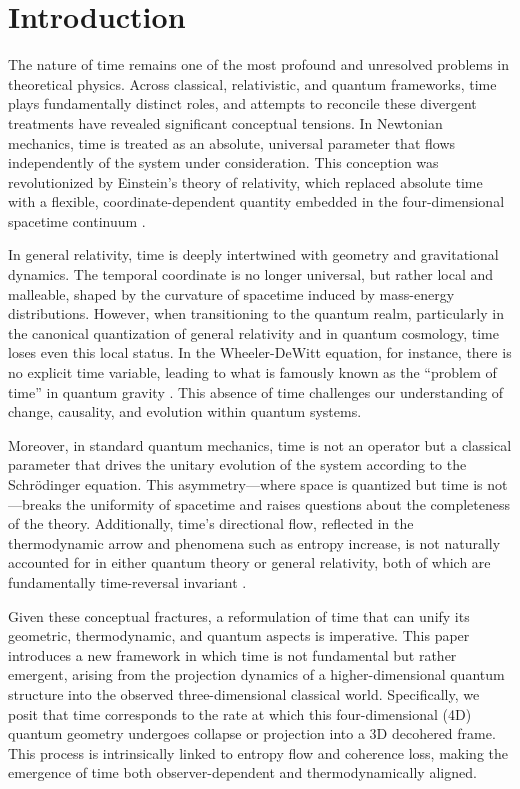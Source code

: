 \documentclass[12pt,a4paper]{article}
\numberwithin{equation}{section}
\begin{document}
\tableofcontents
\newpage

\section{Introduction}
\label{sec:intro}

The nature of time remains one of the most profound and unresolved problems in theoretical physics. Across classical, relativistic, and quantum frameworks, time plays fundamentally distinct roles, and attempts to reconcile these divergent treatments have revealed significant conceptual tensions. In Newtonian mechanics, time is treated as an absolute, universal parameter that flows independently of the system under consideration. This conception was revolutionized by Einstein’s theory of relativity, which replaced absolute time with a flexible, coordinate-dependent quantity embedded in the four-dimensional spacetime continuum \cite{einstein_foundation_1916}.

In general relativity, time is deeply intertwined with geometry and gravitational dynamics. The temporal coordinate is no longer universal, but rather local and malleable, shaped by the curvature of spacetime induced by mass-energy distributions. However, when transitioning to the quantum realm, particularly in the canonical quantization of general relativity and in quantum cosmology, time loses even this local status. In the Wheeler-DeWitt equation, for instance, there is no explicit time variable, leading to what is famously known as the “problem of time” in quantum gravity \cite{kuchar_time_1992, isham_problem_1993}. This absence of time challenges our understanding of change, causality, and evolution within quantum systems.

Moreover, in standard quantum mechanics, time is not an operator but a classical parameter that drives the unitary evolution of the system according to the Schrödinger equation. This asymmetry—where space is quantized but time is not—breaks the uniformity of spacetime and raises questions about the completeness of the theory. Additionally, time’s directional flow, reflected in the thermodynamic arrow and phenomena such as entropy increase, is not naturally accounted for in either quantum theory or general relativity, both of which are fundamentally time-reversal invariant \cite{zeh_arrow_2007}.

Given these conceptual fractures, a reformulation of time that can unify its geometric, thermodynamic, and quantum aspects is imperative. This paper introduces a new framework in which time is not fundamental but rather emergent, arising from the projection dynamics of a higher-dimensional quantum structure into the observed three-dimensional classical world. Specifically, we posit that time corresponds to the rate at which this four-dimensional (4D) quantum geometry undergoes collapse or projection into a 3D decohered frame. This process is intrinsically linked to entropy flow and coherence loss, making the emergence of time both observer-dependent and thermodynamically aligned.
\end{document}
